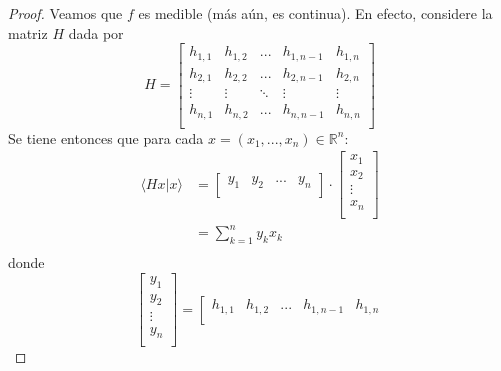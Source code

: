 \documentclass[12pt]{report}
\newcounter{it}
\theoremstyle{largebreak}
\newcommand\pint[2]{\ensuremath{\langle#1| #2\rangle}}
\begin{document}
    \begin{proof}
        Veamos que $f$ es medible (más aún, es continua). En efecto, considere la matriz $H$ dada por
        \begin{equation*}
            H=\left[\begin{array}{ccccc}
                h_{1,1} & h_{1,2} & ... & h_{1,n-1} & h_{1,n}\\
                h_{2,1} & h_{2,2} & ... & h_{2,n-1} & h_{2,n}\\
                \vdots & \vdots & \ddots & \vdots & \vdots \\
                h_{n,1} & h_{n,2} & ... & h_{n,n-1} & h_{n,n}\\
            \end{array}\right]
        \end{equation*}
        Se tiene entonces que para cada $x=(x_1,...,x_n)\in\mathbb{R}^n$:
        \begin{equation*}
            \begin{split}
                \pint{Hx}{x}&=\left[
                    \begin{array}{cccc}
                        y_1 & y_2 & ... & y_n\\
                    \end{array}
                \right]\cdot\left[\begin{array}{c}
                    x_1\\
                    x_2\\
                    \vdots\\
                    x_n\\
                \end{array}\right]\\
                &=\sum_{ k=1}^n y_kx_k\\
            \end{split}
        \end{equation*}
        donde
        \begin{equation*}
            \left[\begin{array}{c}
                y_1\\
                y_2\\
                \vdots\\
                y_n\\
            \end{array}\right]=\left[\begin{array}{ccccc}
                h_{1,1} & h_{1,2} & ... & h_{1,n-1} & h_{1,n}\\

\end{array}
\end{equation*}
\end{proof}
\end{document}
